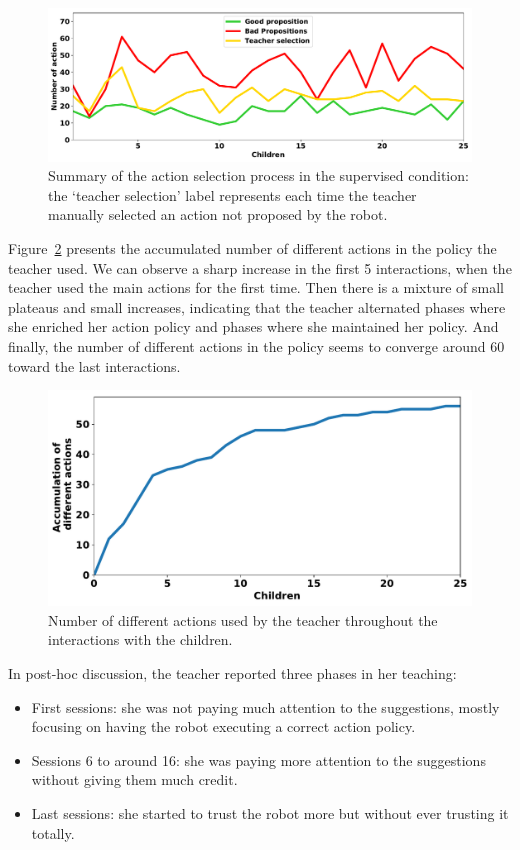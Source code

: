 \begin{figure}[ht]
	\includegraphics[width=1\linewidth]{./summary_supervision.pdf}
	\centering
	\caption{Summary of the action selection process in the supervised condition: the `teacher selection' label represents each time the teacher manually selected an action not proposed by the robot.}
	\label{fig:tutoring_supervision}
\end{figure}


Figure~\ref{fig:tutoring_actions} presents the accumulated number of different actions in the policy the teacher used. We can observe a sharp increase in the first 5 interactions, when the teacher used the main actions for the first time. Then there is a mixture of small plateaus and small increases, indicating that the teacher alternated phases where she enriched her action policy and phases where she maintained her policy. And finally, the number of different actions in the policy seems to converge around 60 toward the last interactions.

\begin{figure}[ht]
	\includegraphics[width=.85\linewidth]{./number_actions.pdf}
	\centering
	\caption{Number of different actions used by the teacher throughout the interactions with the children.}
	\label{fig:tutoring_actions}
\end{figure}


In post-hoc discussion, the teacher reported three phases in her teaching: 
\begin{itemize}
	\item First sessions: she was not paying much attention to the suggestions, mostly focusing on having the robot executing a correct action policy.
	\item Sessions 6 to around 16: she was paying more attention to the suggestions without giving them much credit.
	\item Last sessions: she started to trust the robot more but without ever trusting it totally.
\end{itemize}

